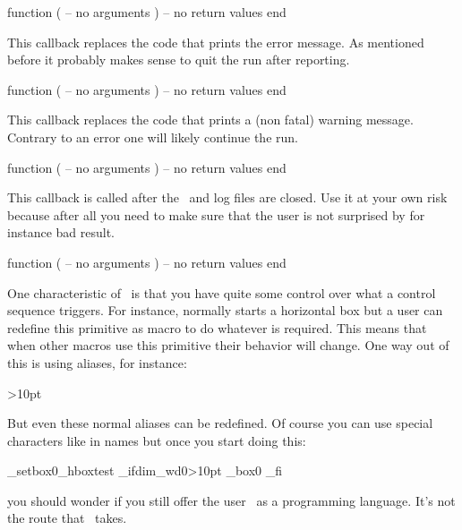 \starttyping[option=LUA]
function (
    -- no arguments
)
    -- no return values
end
\stoptyping

\stopsubsection

\startsubsection[title=show_error_message]

This callback replaces the code that prints the error message. As mentioned before
it probably makes sense to quit the run after reporting.

\starttyping[option=LUA]
function (
    -- no arguments
)
    -- no return values
end
\stoptyping

\stopsubsection

\startsubsection[title=show_warning_message]

This callback replaces the code that prints a (non fatal) warning message.
Contrary to an error one will likely continue the run.

\starttyping[option=LUA]
function (
    -- no arguments
)
    -- no return values
end
\stoptyping

\stopsubsection

\startsubsection[title=wrapup_run]

This callback is called after the \PDF\ and log files are closed. Use it at your own
risk because after all you need to make sure that the user is not surprised by for
instance bad result.

\starttyping[option=LUA]
function (
    -- no arguments
)
    -- no return values
end
\stoptyping

\stopsubsection

\startsubsection[title=handle_overload]

One characteristic of \TEX\ is that you have quite some control over what a
control sequence triggers. For instance, \type {\hbox} normally starts a
horizontal box but a user can redefine this primitive as macro to do whatever is
required. This means that when other macros use this primitive their behavior
will change. One way out of this is using aliases, for instance:

\starttyping
{}
\normalifdim{}>10pt  \normalfi
\stoptyping

But even these normal aliases can be redefined. Of course you can use special
characters like \type {_} in names but once you start doing this:

\starttyping
\p_setbox0\p_hbox{test}
\p_ifdim\p_wd0>10pt \p_box0 \p_fi
\stoptyping

you should wonder if you still offer the user \TEX\ as a programming language.
It's not the route that \CONTEXT\ takes.

